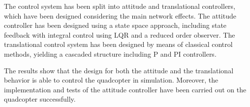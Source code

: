 The control system has been split into attitude and translational controllers, which have been designed considering the main network effects. The attitude controller has been designed using a state space approach, including state feedback with integral control using LQR and a reduced order observer. The translational control system has been designed by means of classical control methods, yielding a cascaded structure including P and PI controllers. 

The results show that the design for both the attitude and the translational behavior is able to control the quadcopter in simulation. Moreover, the implementation and tests of the attitude controller have been carried out on the quadcopter successfully. 


